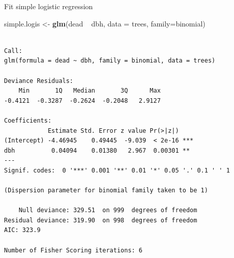 \documentclass[10pt,ignorenonframetext,]{beamer}
\newenvironment{Shaded}{\begin{snugshade}}{\end{snugshade}}
\newcommand{\KeywordTok}[1]{\textcolor[rgb]{0.13,0.29,0.53}{\textbf{{#1}}}}
\newcommand{\DataTypeTok}[1]{\textcolor[rgb]{0.13,0.29,0.53}{{#1}}}
\newcommand{\StringTok}[1]{\textcolor[rgb]{0.31,0.60,0.02}{{#1}}}
\newcommand{\NormalTok}[1]{{#1}}
\begin{document}
\begin{frame}[fragile]{Fit simple logistic regression}

\begin{Shaded}
\begin{Highlighting}[]
\NormalTok{simple.logis <-}\StringTok{ }\KeywordTok{glm}\NormalTok{(dead ~}\StringTok{ }\NormalTok{dbh, }\DataTypeTok{data =} \NormalTok{trees, }\DataTypeTok{family=}\NormalTok{binomial)}
\end{Highlighting}
\end{Shaded}

\begin{verbatim}

Call:
glm(formula = dead ~ dbh, family = binomial, data = trees)

Deviance Residuals: 
    Min       1Q   Median       3Q      Max  
-0.4121  -0.3287  -0.2624  -0.2048   2.9127  

Coefficients:
            Estimate Std. Error z value Pr(>|z|)    
(Intercept) -4.46945    0.49445  -9.039  < 2e-16 ***
dbh          0.04094    0.01380   2.967  0.00301 ** 
---
Signif. codes:  0 '***' 0.001 '**' 0.01 '*' 0.05 '.' 0.1 ' ' 1

(Dispersion parameter for binomial family taken to be 1)

    Null deviance: 329.51  on 999  degrees of freedom
Residual deviance: 319.90  on 998  degrees of freedom
AIC: 323.9

Number of Fisher Scoring iterations: 6
\end{verbatim}

\end{frame}
\end{document}
